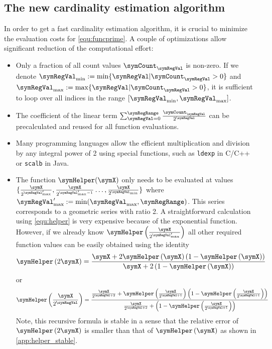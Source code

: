 \documentclass[a4paper]{scrartcl}
\begin{document}
\subsection{The new cardinality estimation algorithm}
In order to get a fast cardinality estimation algorithm, it is crucial to minimize the evaluation costs for \eqref{equ:funcprime}. A couple of optimizations allow significant reduction of the computational effort:
\begin{itemize}
\item Only a fraction of all count values $\symCount_\symRegVal$ is non-zero. If we denote $\symRegVal_\text{min}:=\min\lbrace \symRegVal\vert\symCount_\symRegVal>0\rbrace$ and $\symRegVal_\text{max}:=\max\lbrace \symRegVal\vert\symCount_\symRegVal>0\rbrace$,  it is sufficient to loop over all indices in the range $[\symRegVal_\text{min}, \symRegVal_\text{max}]$.
\item The coefficient of the linear term $\sum_{\symRegVal=0}^\symRegRange \frac{\symCount_\symRegVal}{2^\symRegVal}$ can be precalculated and reused for all function evaluations.
\item Many programming languages allow the efficient multiplication and division by any integral power of 2 using special functions, such as \texttt{ldexp} in C/C++ or \texttt{scalb} in Java.
\item The function $\symHelper(\symX)$ only needs to be evaluated at values $\lbrace\frac{\symX}{2^{\symRegVal'_\text{max}}},\frac{\symX}{2^{\symRegVal'_\text{max}-1}}\ldots,\frac{\symX}{2^{\symRegVal_\text{min}}}\rbrace$ where $\symRegVal'_\text{max} := \min(\symRegVal_\text{max}, \symRegRange)$. This series corresponds to a geometric series with ratio 2. A straightforward calculation using \eqref{equ:helper} is very expensive because of the exponential function. However, if we already know $\symHelper\left(\frac{\symX}{2^{\symRegVal'_\text{max}}}\right)$ all other required function values can be easily obtained using the identity
\begin{equation}
\label{equ:helper_recursion1}
\symHelper\left(2\symX\right) = \frac{\symX+2\symHelper\left(\symX\right)\left(1-\symHelper\left(\symX\right)\right)}{\symX+2\left(1-\symHelper\left(\symX\right)\right)}
\end{equation}
or
\begin{equation}
\label{equ:helper_recursion2}
\symHelper\left(\frac{\symX}{2^{\symRegVal}}\right) = \frac{\frac{\symX}{2^{\symRegVal+2}}+\symHelper\left(\frac{\symX}{2^{\symRegVal+1}}\right)\left(1-\symHelper\left(\frac{\symX}{2^{\symRegVal+1}}\right)\right)}{\frac{\symX}{2^{\symRegVal+2}}+\left(1-\symHelper\left(\frac{\symX}{2^{\symRegVal+1}}\right)\right)}
\end{equation}
Note, this recursive formula is stable in a sense that the relative error of $\symHelper\left(2\symX\right)$ is smaller than that of $\symHelper\left(\symX\right)$ as shown in \autoref{app:helper_stable}.


\end{itemize}
\end{document}
